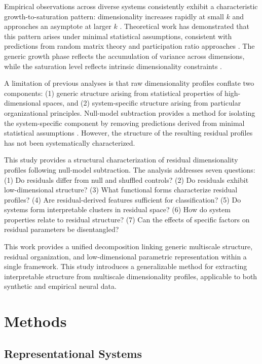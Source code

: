 \documentclass[11pt]{article}
\begin{document}
Empirical observations across diverse systems consistently exhibit a characteristic growth-to-saturation pattern: dimensionality increases rapidly at small $k$ and approaches an asymptote at larger $k$ \citep{travesset2022extended, stringer2019high}. Theoretical work has demonstrated that this pattern arises under minimal statistical assumptions, consistent with predictions from random matrix theory \citep{marchenko1967distribution, couillet2011random} and participation ratio approaches \citep{penzel2022spectral}. The generic growth phase reflects the accumulation of variance across dimensions, while the saturation level reflects intrinsic dimensionality constraints \citep{jolliffe2002principal}.

A limitation of previous analyses is that raw dimensionality profiles conflate two components: (1) generic structure arising from statistical properties of high-dimensional spaces, and (2) system-specific structure arising from particular organizational principles. Null-model subtraction provides a method for isolating the system-specific component by removing predictions derived from minimal statistical assumptions \citep{paper3, paper4}. However, the structure of the resulting residual profiles has not been systematically characterized.

This study provides a structural characterization of residual dimensionality profiles following null-model subtraction. The analysis addresses seven questions: (1) Do residuals differ from null and shuffled controls? (2) Do residuals exhibit low-dimensional structure? (3) What functional forms characterize residual profiles? (4) Are residual-derived features sufficient for classification? (5) Do systems form interpretable clusters in residual space? (6) How do system properties relate to residual structure? (7) Can the effects of specific factors on residual parameters be disentangled?

This work provides a unified decomposition linking generic multiscale structure, residual organization, and low-dimensional parametric representation within a single framework. This study introduces a generalizable method for extracting interpretable structure from multiscale dimensionality profiles, applicable to both synthetic and empirical neural data.

\section{Methods}

\subsection{Representational Systems}
\end{document}
